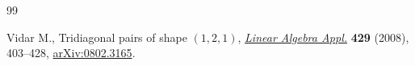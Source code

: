 \documentclass[10pt,a4paper]{amsart}
\begin{document}
\begin{thebibliography}{99}

Vidar M.,
Tridiagonal pairs of shape $(1,2,1)$,
\href{http://dx.doi.org/10.1016/j.laa.2008.02.034}{{\it Linear Algebra Appl.}} {\bf 429} (2008), 403--428,
\href{http://arxiv.org/abs/0802.3165}{arXiv:0802.3165}.

\end{thebibliography}
\end{document}
